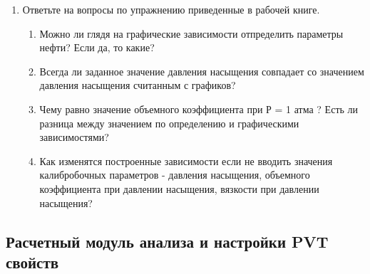 \begin{enumerate}
	функция расчета вязкости воды при заданных термобарических условиях
	
	{ \small  \texttt{=PVT\_Muw\_cP(B23;C23;gamma\_gas\_;gamma\_oil\_;gamma\_wat\_; Rsb\_; Rp\_; Pb\_;Tres\_;Bob\_;muob\_)}}
	
	функция расчета плотности газа при заданных термобарических условиях
	
	{ \small  \texttt{=PVT\_Rhog\_kgm3(B23;C23;gamma\_gas\_;gamma\_oil\_;gamma\_wat\_; Rsb\_; Rp\_; Pb\_;Tres\_;Bob\_;muob\_)}}
	
	функция расчета плотности воды при заданных термобарических условиях
	
	{ \small  \texttt{=PVT\_Rhow\_kgm3(B23;C23;gamma\_gas\_;gamma\_oil\_;gamma\_wat\_; Rsb\_; Rp\_; Pb\_;Tres\_;Bob\_;muob\_)}}
	
	функция расчета плотности нефти при заданных термобарических условиях
	
	{ \small  \texttt{=PVT\_Rhoo\_kgm3(B23;C23;gamma\_gas\_;gamma\_oil\_;gamma\_wat\_; Rsb\_; Rp\_; Pb\_;Tres\_;Bob\_;muob\_)}}
	
	Результаты приведены на рисунке \ref{ris:Ex10_6}
	
	\begin{figure}[h!]
		\center{\texttt{[image: Ex10\_6]}}
		\caption{Результат расчета зависимости свойств пластовых флюидов от давления}
		\label{ris:Ex10_6}
	\end{figure}
	
	\item Ответьте на вопросы по упражнению приведенные в рабочей книге.
	
	\begin{enumerate}
		\item Можно ли глядя на графические зависимости отпределить параметры нефти? Если да, то какие?
		\item Всегда ли заданное значение давления насыщения совпадает со значением давления насыщения считанным с графиков?
		\item Чему равно значение объемного коэффициента при Р = 1 атма ? Есть ли разница между значением по определению и графическими зависимостями?
		\item Как изменятся построенные зависимости если не вводить значения калибробочных параметров - давления насыщения, объемного коэффициента при давлении насыщения, вязкости при давлении насыщения?
		
	\end{enumerate}
 
\end{enumerate}

\subsection{Расчетный модуль анализа и настройки PVT свойств}
